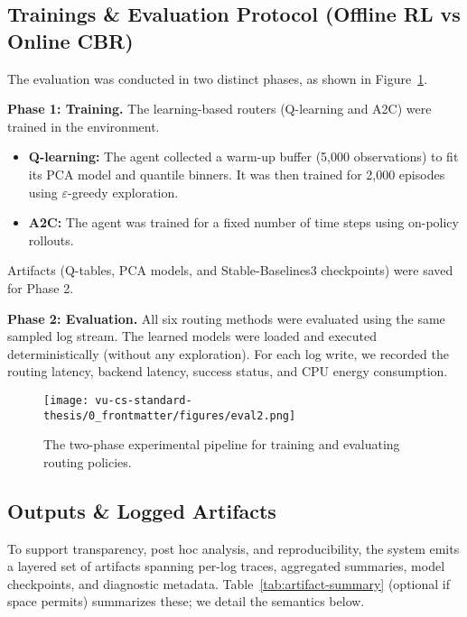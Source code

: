 \subsection{Trainings \& Evaluation Protocol (Offline RL vs Online CBR)}
The evaluation was conducted in two distinct phases, as shown in Figure~\ref{fig:experiment-pipeline}.

\textbf{Phase 1: Training.} The learning-based routers (Q-learning and A2C) were trained in the environment.

\begin{itemize}
    \item \textbf{Q-learning:} The agent collected a warm-up buffer (5,000 observations) to fit its PCA model and quantile binners. It was then trained for 2,000 episodes using $\varepsilon$-greedy exploration.
    
    \item \textbf{A2C:} The agent was trained for a fixed number of time steps using on-policy rollouts.
\end{itemize}

Artifacts (Q-tables, PCA models, and Stable-Baselines3 checkpoints) were saved for Phase 2.

\textbf{Phase 2: Evaluation.} All six routing methods were evaluated using the same sampled log stream. The learned models were loaded and executed deterministically (without any exploration). For each log write, we recorded the routing latency, backend latency, success status, and CPU energy consumption.

\begin{figure}[htbp]
\centering
\texttt{[image: vu-cs-standard-thesis/0\_frontmatter/figures/eval2.png]}
\caption{The two-phase experimental pipeline for training and evaluating routing policies.}
\label{fig:experiment-pipeline}
\end{figure}



\subsection{Outputs \& Logged Artifacts}
\label{s:outputs-artifacts}

To support transparency, post hoc analysis, and reproducibility, the system emits a layered set of artifacts spanning per-log traces, aggregated summaries, model checkpoints, and diagnostic metadata. Table~\ref{tab:artifact-summary} (optional if space permits) summarizes these; we detail the semantics below.

